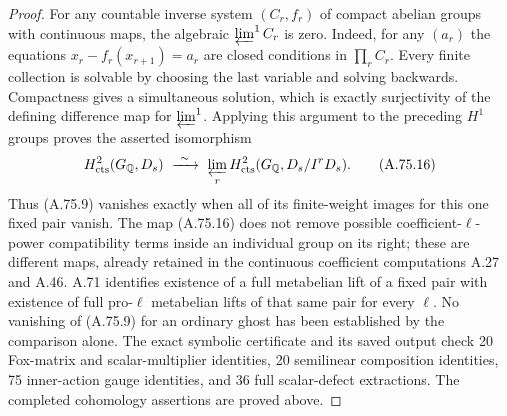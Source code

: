 \begin{proof}
For any countable inverse system $(C_r,f_r)$ of compact
abelian groups with continuous maps, the algebraic
$\varprojlim^1 C_r$ is zero.
Indeed, for any $(a_r)$ the equations
$x_r-f_r(x_{r+1})=a_r$ are closed conditions in
$\prod_r C_r$.
Every finite collection is solvable by choosing the
last variable and solving backwards.
Compactness gives a simultaneous solution, which is
exactly surjectivity of the defining difference map
for $\varprojlim^1$.
Applying this argument to the preceding $H^1$ groups
proves the asserted isomorphism
\[
 H^2_{\rm cts}(G_\mathbb Q,D_s)
       \ \xrightarrow{\ \sim\ }\
 \varprojlim_r
 H^2_{\rm cts}(G_\mathbb Q,D_s/I^rD_s).
 \tag{A.75.16}
\]
Thus (A.75.9) vanishes exactly when all of its
finite-weight images for this one fixed pair vanish.
The map (A.75.16) does not remove possible
coefficient-$\ell$-power compatibility terms inside an
individual group on its right; these are different
maps, already retained in the continuous coefficient
computations A.27 and A.46.
A.71 identifies existence of a full metabelian lift of a
fixed pair with existence of full pro-$\ell$ metabelian
lifts of that same pair for every $\ell$.
No vanishing of (A.75.9) for an ordinary ghost has been
established by the comparison alone.
The exact symbolic certificate
 and its saved output
check 20 Fox-matrix and scalar-multiplier identities, 20
semilinear composition identities, 75 inner-action gauge
identities, and 36 full scalar-defect extractions.
The completed cohomology assertions are proved above.
\end{proof}
